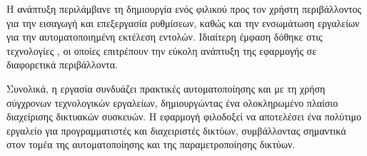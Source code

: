 Η ανάπτυξη περιλάμβανε τη δημιουργία ενός φιλικού προς τον χρήστη 
περιβάλλοντος για την εισαγωγή και επεξεργασία ρυθμίσεων, καθώς και 
την ενσωμάτωση εργαλείων για την αυτοματοποιημένη εκτέλεση εντολών. 
Ιδιαίτερη έμφαση δόθηκε στις τεχνολογίες , 
οι οποίες επιτρέπουν την εύκολη ανάπτυξη της εφαρμογής σε διαφορετικά περιβάλλοντα.

Συνολικά, η εργασία συνδυάζει πρακτικές αυτοματοποίησης και  
με τη χρήση σύγχρονων τεχνολογικών εργαλείων, δημιουργώντας ένα 
ολοκληρωμένο πλαίσιο διαχείρισης δικτυακών συσκευών. 
Η εφαρμογή φιλοδοξεί να αποτελέσει ένα πολύτιμο εργαλείο 
για προγραμματιστές και διαχειριστές δικτύων, συμβάλλοντας 
σημαντικά στον τομέα της αυτοματοποίησης και της παραμετροποίησης 
δικτύων.